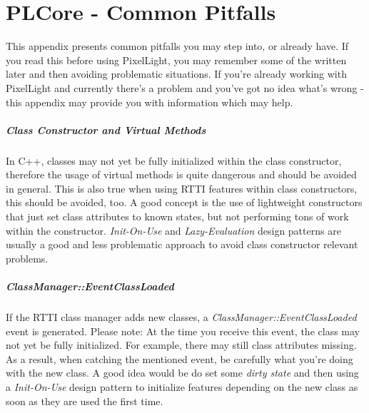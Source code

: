 \chapter{PLCore - Common Pitfalls}
\label{Appendix:CommonPitfalls}
This appendix presents common pitfalls you may step into, or already have. If you read this before using PixelLight, you may remember some of the written later and then avoiding problematic situations. If you're already working with PixelLight and currently there's a problem and you've got no idea what's wrong - this appendix may provide you with information which may help.


\paragraph{Class Constructor and Virtual Methods}
In C++, classes may not yet be fully initialized within the class constructor, therefore the usage of virtual methods is quite dangerous and should be avoided in general. This is also true when using RTTI features within class constructors, this should be avoided, too. A good concept is the use of lightweight constructors that just set class attributes to known states, but not performing tons of work within the constructor. \emph{Init-On-Use} and \emph{Lazy-Evaluation} design patterns are usually a good and less problematic approach to avoid class constructor relevant problems.


\paragraph{ClassManager::EventClassLoaded}
If the RTTI class manager adds new classes, a \emph{ClassManager::EventClassLoaded} event is generated. Please note: At the time you receive this event, the class may not yet be fully initialized. For example, there may still class attributes missing. As a result, when catching the mentioned event, be carefully what you're doing with the new class. A good idea would be do set some \emph{dirty state} and then using a \emph{Init-On-Use} design pattern to initialize features depending on the new class as soon as they are used the first time.


